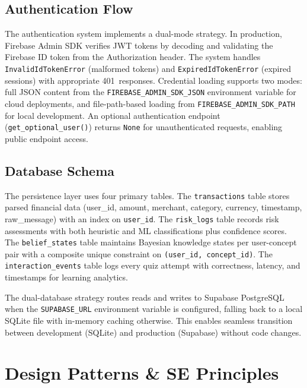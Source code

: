 \documentclass[conference]{IEEEtran}
\begin{document}
\subsection{Authentication Flow}

The authentication system implements a dual-mode strategy. In production, Firebase Admin SDK verifies JWT tokens by decoding and validating the Firebase ID token from the Authorization header. The system handles \texttt{InvalidIdTokenError} (malformed tokens) and \texttt{ExpiredIdTokenError} (expired sessions) with appropriate 401~responses. Credential loading supports two modes: full JSON content from the \texttt{FIREBASE\_ADMIN\_SDK\_JSON} environment variable for cloud deployments, and file-path-based loading from \texttt{FIREBASE\_ADMIN\_SDK\_PATH} for local development. An optional authentication endpoint (\texttt{get\_optional\_user()}) returns \texttt{None} for unauthenticated requests, enabling public endpoint access.

\subsection{Database Schema}

The persistence layer uses four primary tables. The \texttt{transactions} table stores parsed financial data (user\_id, amount, merchant, category, currency, timestamp, raw\_message) with an index on \texttt{user\_id}. The \texttt{risk\_logs} table records risk assessments with both heuristic and ML classifications plus confidence scores. The \texttt{belief\_states} table maintains Bayesian knowledge states per user-concept pair with a composite unique constraint on \texttt{(user\_id, concept\_id)}. The \texttt{interaction\_events} table logs every quiz attempt with correctness, latency, and timestamps for learning analytics.

The dual-database strategy routes reads and writes to Supabase PostgreSQL when the \texttt{SUPABASE\_URL} environment variable is configured, falling back to a local SQLite file with in-memory caching otherwise. This enables seamless transition between development (SQLite) and production (Supabase) without code changes.

\section{Design Patterns \& SE Principles}
\end{document}
